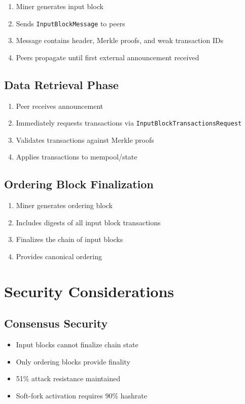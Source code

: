 \documentclass{llncs}
\newcommand{\code}[1]{\texttt{#1}}
\begin{document}
\begin{enumerate}
\item Miner generates input block
\item Sends \code{InputBlockMessage} to peers
\item Message contains header, Merkle proofs, and weak transaction IDs
\item Peers propagate until first external announcement received
\end{enumerate}

\subsection{Data Retrieval Phase}

\begin{enumerate}
\item Peer receives announcement
\item Immediately requests transactions via \code{InputBlockTransactionsRequest}
\item Validates transactions against Merkle proofs
\item Applies transactions to mempool/state
\end{enumerate}

\subsection{Ordering Block Finalization}

\begin{enumerate}
\item Miner generates ordering block
\item Includes digests of all input block transactions
\item Finalizes the chain of input blocks
\item Provides canonical ordering
\end{enumerate}

\section{Security Considerations}

\subsection{Consensus Security}

\begin{itemize}
\item Input blocks cannot finalize chain state
\item Only ordering blocks provide finality
\item 51\% attack resistance maintained
\item Soft-fork activation requires 90\% hashrate
\end{itemize}
\end{document}
